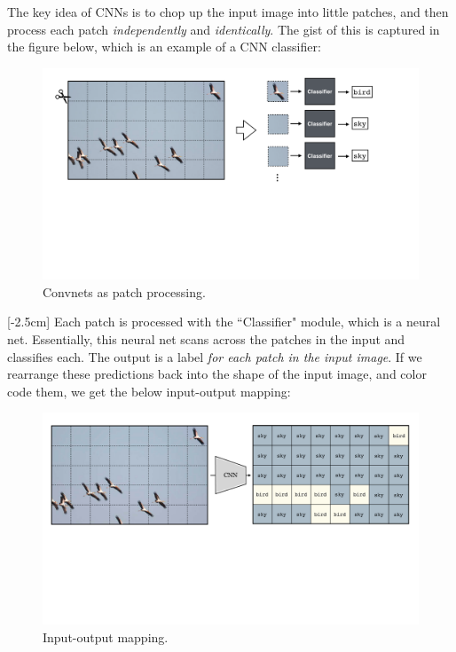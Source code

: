 The key idea of CNNs is to chop up the input image into little patches, and then process each patch \textit{independently} and \textit{identically}. The gist of this is captured in the figure below, which is an example of a CNN classifier:
\vspace{-0.4cm}
\begin{figure}[h]
\centerline{
    \includegraphics[width=0.85\linewidth]{./figures/convolutional_neural_nets/CNNs_as_patch_processing.pdf}}
    \caption{Convnets as patch processing. }
    \label{fig:convolutional_neural_nets:CNNs_as_patch_processing}
\end{figure}
\vspace{-0.4cm}

[-2.5cm]
Each patch is processed with the ``Classifier" module, which is a neural net. Essentially, this neural net scans across the patches in the input and classifies each. The output is a label \textit{for each patch in the input image}. If we rearrange these predictions back into the shape of the input image, and color code them, we get the below input-output mapping:
\vspace{-0.2cm}
\begin{figure}[h!]
\centerline{
    \includegraphics[width=0.85\linewidth]{./figures/convolutional_neural_nets/CNN_example_coarse.pdf}}
    \label{fig:convolutional_neural_nets:CNN_example_coarse}
    \caption{Input-output mapping.}
\end{figure}

